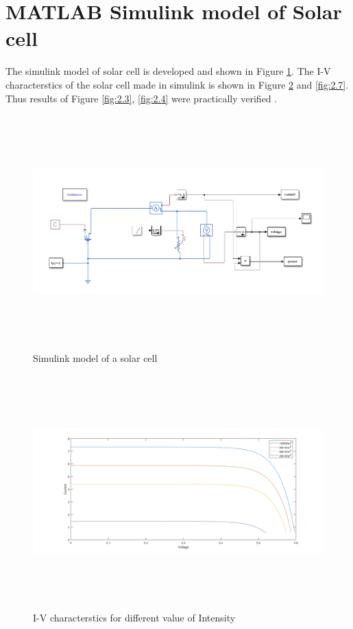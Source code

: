 \documentclass[a4paper,12pt]{iitmdiss}
\begin{document}
\section{MATLAB Simulink model of Solar cell}
The simulink model of solar cell is developed and shown in Figure \ref{fig:2.5}. The I-V characterstics of the solar cell made in simulink is shown in Figure \ref{fig:2.6} and \ref{fig:2.7}. Thus results of Figure \ref{fig:2.3}, \ref{fig:2.4} were practically verified .

\begin{figure}[hbt!]
    \centering
    \includegraphics[width=17cm,height=9cm]{Solar Pv simulink(1).png}
    \caption{Simulink model of a solar cell}
    \label{fig:2.5}
\end{figure}

\begin{figure}[hbt!]
    \centering
    \includegraphics[width=16cm,height=9cm]{I-V for diff intensity(1).png}
    \caption{I-V characterstics for different value of Intensity}
    \label{fig:2.6}
\end{figure}
\end{document}
